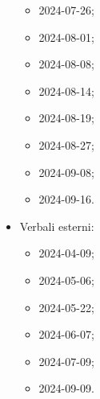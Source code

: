 \begin{itemize}
\begin{itemize}
    \item 2024-07-26;
    \item 2024-08-01;
    \item 2024-08-08;
    \item 2024-08-14;
    \item 2024-08-19;
    \item 2024-08-27;
    \item 2024-09-08;
    \item 2024-09-16.
  \end{itemize}
  \item Verbali esterni:
  \begin{itemize}
    \item 2024-04-09;
    \item 2024-05-06;
    \item 2024-05-22;
    \item 2024-06-07;
    \item 2024-07-09;
    \item 2024-09-09.
  \end{itemize}
\end{itemize}